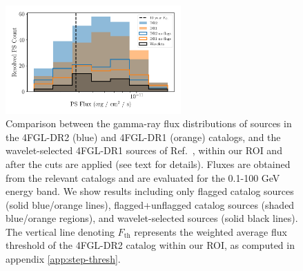 \documentclass[letter,11pt]{article}
\begin{document}
\begin{figure}
    \centering
    \includegraphics[width=0.6\textwidth]{figs/compare-catalogs.pdf}
    \caption{Comparison between the gamma-ray flux distributions of sources in the 4FGL-DR2 (blue) and 4FGL-DR1 (orange) catalogs, and the wavelet-selected 4FGL-DR1 sources of Ref.~\cite{Zhong:2019ycb}, within our ROI and after the cuts are applied (see text for details). Fluxes are obtained from the relevant catalogs and are evaluated for the 0.1-100 GeV energy band. We show results including only flagged catalog sources (solid blue/orange lines), flagged+unflagged catalog sources (shaded blue/orange regions), and wavelet-selected sources (solid black lines). The vertical line denoting $F_\text{th}$ represents the weighted average flux threshold of the 4FGL-DR2 catalog within our ROI, as computed in appendix \ref{app:step-thresh}.}
    \label{fig:fgl-to-wavelet-comparison}
\end{figure}
\end{document}

